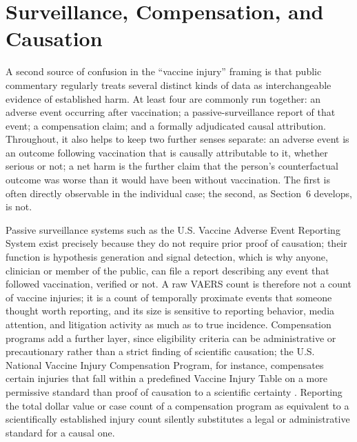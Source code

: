 \documentclass[11pt]{article}
\begin{document}
\section{Surveillance, Compensation, and Causation}

A second source of confusion in the ``vaccine injury'' framing is that public commentary regularly treats several distinct kinds of data as interchangeable evidence of established harm. At least four are commonly run together: an adverse event occurring after vaccination; a passive-surveillance report of that event; a compensation claim; and a formally adjudicated causal attribution. Throughout, it also helps to keep two further senses separate: an adverse event is an outcome following vaccination that is causally attributable to it, whether serious or not; a net harm is the further claim that the person's counterfactual outcome was worse than it would have been without vaccination. The first is often directly observable in the individual case; the second, as Section~6 develops, is not.

Passive surveillance systems such as the U.S. Vaccine Adverse Event Reporting System exist precisely because they do not require prior proof of causation; their function is hypothesis generation and signal detection, which is why anyone, clinician or member of the public, can file a report describing any event that followed vaccination, verified or not. A raw VAERS count is therefore not a count of vaccine injuries; it is a count of temporally proximate events that someone thought worth reporting, and its size is sensitive to reporting behavior, media attention, and litigation activity as much as to true incidence. Compensation programs add a further layer, since eligibility criteria can be administrative or precautionary rather than a strict finding of scientific causation; the U.S. National Vaccine Injury Compensation Program, for instance, compensates certain injuries that fall within a predefined Vaccine Injury Table on a more permissive standard than proof of causation to a scientific certainty \citep{nvicp2024}. Reporting the total dollar value or case count of a compensation program as equivalent to a scientifically established injury count silently substitutes a legal or administrative standard for a causal one.
\end{document}
